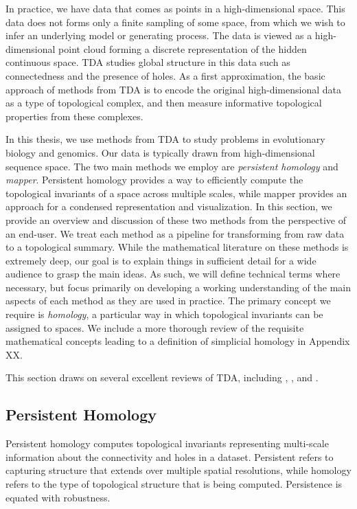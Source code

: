 In practice, we have data that comes as points in a high-dimensional space.
This data does not forms only a finite sampling of some space, from which we wish to infer an underlying model or generating process.
The data is viewed as a high-dimensional point cloud forming a discrete representation of the hidden continuous space.
TDA studies global structure in this data such as connectedness and the presence of holes.
As a first approximation, the basic approach of methods from TDA is to encode the original high-dimensional data as a type of topological complex, and then measure informative topological properties from these complexes.

In this thesis, we use methods from TDA to study problems in evolutionary biology and genomics.
Our data is typically drawn from high-dimensional sequence space.
The two main methods we employ are \emph{persistent homology} and \emph{mapper}.
Persistent homology provides a way to efficiently compute the topological invariants of a space across multiple scales, while mapper provides an approach for a condensed representation and visualization.
In this section, we provide an overview and discussion of these two methods from the perspective of an end-user.
We treat each method as a pipeline for transforming from raw data to a topological summary.
While the mathematical literature on these methods is extremely deep, our goal is to explain things in sufficient detail for a wide audience to grasp the main ideas.
As such, we will define technical terms where necessary, but focus primarily on developing a working understanding of the main aspects of each method as they are used in practice.
The primary concept we require is \emph{homology}, a particular way in which topological invariants can be assigned to spaces.
We include a more thorough review of the requisite mathematical concepts leading to a definition of simplicial homology in Appendix XX.

This section draws on several excellent reviews of TDA, including \cite{Carlsson:2009a}, \cite{Edelsbrunner:2010}, and \cite{Ghrist:2008}.

\subsection{Persistent Homology}

Persistent homology computes topological invariants representing multi-scale information about the connectivity and holes in a dataset.
Persistent refers to capturing structure that extends over multiple spatial resolutions, while homology refers to the type of topological structure that is being computed.
Persistence is equated with robustness.

